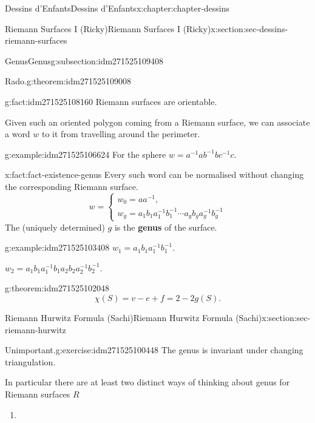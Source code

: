 \documentclass[oneside,10pt,]{book}
\newcommand{\terminology}[1]{\textbf{#1}}
\numberwithin{equation}{section}
\newcommand{\inv}{^{-1}}
\begin{document}
\begin{chapterptx}{Dessins d'Enfants}{}{Dessins d'Enfants}{}{}{x:chapter:chapter-dessins}
\begin{sectionptx}{Riemann Surfaces I (Ricky)}{}{Riemann Surfaces I (Ricky)}{}{}{x:section:sec-dessins-riemann-surfaces}
\begin{subsectionptx}{Genus}{}{Genus}{}{}{g:subsection:idm271525109408}
\begin{theorem}{Rado.}{}{g:theorem:idm271525109008}
\end{theorem}
\begin{fact}{}{}{g:fact:idm271525108160}%
Riemann surfaces are orientable.%
\end{fact}
Given such an oriented polygon coming from a Riemann surface, we can associate a word \(w\) to it from travelling around the perimeter.%
\begin{example}{}{g:example:idm271525106624}%
For the sphere \(w = a\inv ab\inv bc\inv c\).%
\end{example}
\begin{fact}{}{}{x:fact:fact-existence-genus}%
Every such word can be normalised without changing the corresponding Riemann surface.%
\begin{equation*}
w = \begin{cases} w_0 = aa\inv,\\ w_g = a_1b_1 a_1\inv b_1\inv \cdots a_gb_g a_g\inv b_g\inv\end{cases}
\end{equation*}
The (uniquely determined) \(g\) is the \terminology{genus} of the surface.%
\end{fact}
\begin{example}{}{g:example:idm271525103408}%
\(w_1 = a_1b_1 a_1\inv b_1 \inv\).%
\par
\(w_2 = a_1b_1 a_1\inv b_1a_2b_2 a_2\inv b_2 \inv\).%
\end{example}
\begin{theorem}{}{}{g:theorem:idm271525102048}%
%
\begin{equation*}
\chi (S) = v- e + f = 2-2g(S)\text{.}
\end{equation*}
%
\end{theorem}
\end{subsectionptx}
\end{sectionptx}
%
%
\typeout{************************************************}
\typeout{************************************************}
%
\begin{sectionptx}{Riemann Hurwitz Formula (Sachi)}{}{Riemann Hurwitz Formula (Sachi)}{}{}{x:section:sec-riemann-hurwitz}
\begin{inlineexercise}{Unimportant.}{g:exercise:idm271525100448}%
The genus is invariant under changing triangulation.%
\end{inlineexercise}
In particular there are at least two distinct ways of thinking about genus for Riemann surfaces \(R\)%
\begin{enumerate}
\item{}%

\end{enumerate}
\end{sectionptx}
\end{chapterptx}
\end{document}
